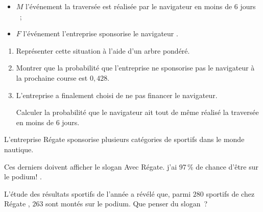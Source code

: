     \begin{itemize}
          \item $M$ l'événement \og la traversée est réalisée par le navigateur en moins de 6 jours \fg~;
          \item $F$ l'événement \og l'entreprise sponsorise le navigateur \fg.
     \end{itemize}
          \begin{enumerate}
               \item Représenter cette situation à l'aide d'un arbre pondéré.
               \item  Montrer que la probabilité que l'entreprise ne sponsorise pas le navigateur à la
               prochaine course est $0,428$.
               \item  L'entreprise a finalement choisi de ne pas financer le navigateur.
               \par
               Calculer la probabilité que le navigateur ait tout de même réalisé la traversée en moins
               de $6$ jours.
          \end{enumerate}
          \bigbreak
          \medbreak
          L'entreprise \og Régate \fg sponsorise plusieurs catégories de sportifs dans le monde nautique.
          \par
          Ces derniers doivent afficher le slogan \og Avec Régate. j'ai 97\,\% de chance d'être sur le podium! \fg.
          \par
          L'étude des résultats sportifs de l'année a révélé que, parmi $280$ sportifs de chez \og Régate \fg, $263$ sont montés sur le podium. Que penser du slogan~?
          \medbreak

